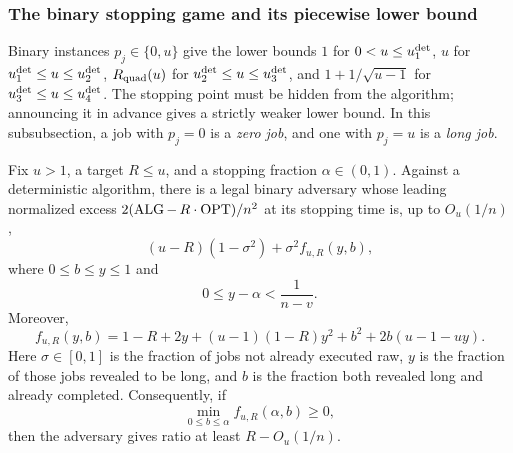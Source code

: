 \subsubsection{The binary stopping game and its piecewise lower bound}
\label{sec:optional-lower}

Binary instances $p_j\in\{0,u\}$ give the lower bounds $1$ for
$0<u\le u_{1}^{\mathrm{det}}$, $u$ for $u_{1}^{\mathrm{det}}\le u\le u_{2}^{\mathrm{det}}$,
$R_{\mathrm{quad}}(u)$ for $u_{2}^{\mathrm{det}}\le u\le u_{3}^{\mathrm{det}}$, and
$1+1/\sqrt{u-1}$ for $u_{3}^{\mathrm{det}}\le u\le u_{4}^{\mathrm{det}}$.  The stopping point
must be hidden from the algorithm;
announcing it in advance gives a strictly weaker lower bound.
In this subsubsection, a job with $p_j=0$ is a \emph{zero job}, and one with
$p_j=u$ is a \emph{long job}.

\begin{lemma}
\label{lem:opt:hidden-stopping}
Fix $u>1$, a target $R\le u$, and a stopping fraction $\alpha\in(0,1)$.
Against a deterministic algorithm, there is a legal binary adversary whose
leading normalized excess $2(\operatorname{ALG}-\,R\cdot\operatorname{OPT})/n^2$ at its stopping time is,
up to $O_u(1/n)$,
\begin{equation}
 (u-R)(1-\sigma^2)+\sigma^2 f_{u,R}(y,b),
 \label{eq:opt:stopping-decomposition}
\end{equation}
where $0\le b\le y\le1$ and
\begin{equation}
 0\le y-\alpha<\frac1{n-v}.
 \label{eq:opt:stopping-overshoot}
\end{equation}
Moreover,
\begin{equation}
 f_{u,R}(y,b)=
 1-R+2y+(u-1)(1-R)y^2
 +b^2+2b(u-1-uy).
 \label{eq:opt:stopping-f}
\end{equation}
Here $\sigma\in[0,1]$ is the fraction of jobs not already executed raw,
$y$ is the fraction of those jobs revealed to be long, and $b$ is the
fraction both revealed long and already completed.
Consequently, if
\[
 \min_{0\le b\le\alpha}f_{u,R}(\alpha,b)\ge0,
\]
then the adversary gives ratio at least $R-O_u(1/n)$.
\end{lemma}


